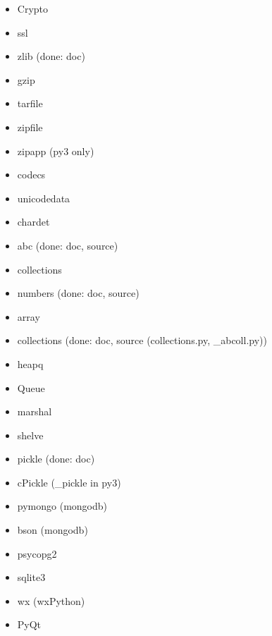 \documentclass{article}
\begin{document}
\begin{enumerate}
\begin{itemize}
            \item Crypto
            \item ssl

            \item zlib (done: doc)
            \item gzip
            \item tarfile
            \item zipfile
            \item zipapp (py3 only)

            \item codecs
            \item unicodedata
            \item chardet

            \item abc (done: doc, source)
            \item collections
            \item numbers (done: doc, source)

            \item array
            \item collections (done: doc, source (collections.py, _abcoll.py))
            \item heapq
            \item Queue

            \item marshal
            \item shelve
            \item pickle (done: doc)
            \item cPickle (_pickle in py3)
            \item pymongo (mongodb)
            \item bson (mongodb)
            \item psycopg2
            \item sqlite3

            \item wx (wxPython)
            \item PyQt


\end{itemize}
\end{enumerate}
\end{document}
